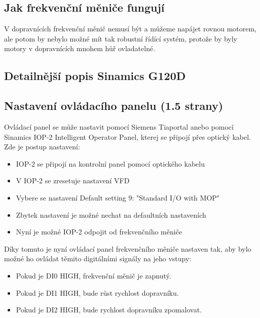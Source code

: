 \subsection{Jak frekvenční měniče fungují}\label{sec:JakFungujiFrekvencniMenice}

V dopravnících frekvenční měnič nemusí být a můžeme napájet rovnou motorem, ale potom by nebylo možné mít tak robustní řídící systém, protože by byly motory v dopravnících mnohem hůř ovladatelné.

\subsection{Detailnější popis Sinamics G120D}


\subsection{Nastavení ovládacího panelu (1.5 strany)}\label{sec:NastaveniOvladacihoPanelu}

Ovládací panel se může nastavit pomocí Siemens Tiaportal anebo pomocí Sinamics IOP‑2 Intelligent Operator Panel, kterej se připojí přes optický kabel. Zde je postup nastavení:\cite{SiemensG120DGettingStarted}
\begin{itemize}
    \item IOP-2 se připojí na kontrolní panel pomocí optického kabelu
    \item V IOP-2 se zresetuje nastavení VFD
    \item Vybere se nastavení Default setting 9: "Standard I/O with MOP" 
    \item Zbytek nastavení je možné nechat na defaultních nastaveních
    \item Nyní je možné IOP-2 odpojit od frekvenčního měniče
\end{itemize}

Díky tomuto je nyní ovládací panel frekvenčního měniče nastaven tak, aby bylo možné ho ovládat těmito digitálními signály na jeho vstupy:
\begin{itemize}
    \item Pokud je DI0 HIGH, frekvenční měnič je zapnutý.
    \item Pokud je DI1 HIGH, bude růst rychlost dopravníku.
    \item Pokud je DI2 HIGH, bude rychlost dopravníku zpomalovat.
\end{itemize}

